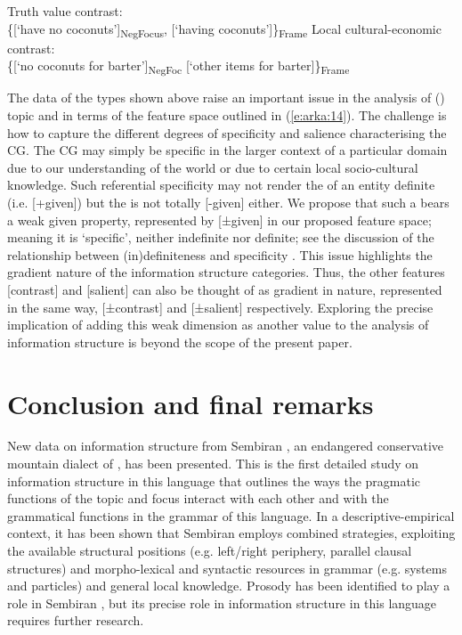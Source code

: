 \documentclass[output=paper
,modfonts
,nonflat]{langsci/langscibook}
\begin{document}
\begin{exe}
	\ex\label{e:arka:61}
	\begin{xlist}
		\ex\label{e:arka:61a}
		Truth value contrast:\\
		\{[‘have no coconuts’]\textsubscript{NegFocus}, [‘having coconuts’]\}\textsubscript{Frame} 
		\ex\label{e:arka:61b}
		Local cultural-economic contrast:\\
		\{[‘no coconuts for barter’]\textsubscript{NegFoc}  [‘other items for barter]\}\textsubscript{Frame}
	\end{xlist}
\end{exe}

\noindent
The data of the types shown above raise an important issue in the analysis of () topic and  in terms of the feature space outlined in (\ref{e:arka:14}). The challenge is how to capture the different degrees of specificity and salience characterising the CG. The CG may simply be specific in the larger context of a particular domain due to our understanding of the world or due to certain local socio-cultural knowledge. Such referential specificity may not render the  of an entity definite (i.e. [+given]) but the  is not totally [-given] either. We propose that such a  bears a weak given property, represented by [±given] in our proposed feature space; meaning it is ‘specific’, neither indefinite nor definite; see the discussion of the relationship between (in)definiteness and specificity \citep{Enç1991}. This issue highlights the gradient nature of the information structure categories. Thus, the other features [contrast] and [salient] can also be thought of as gradient in nature, represented in the same way, [±contrast] and [±salient] respectively. Exploring the precise implication of adding this weak dimension as another value to the analysis of information structure is beyond the scope of the present paper.

\section{\label{s:arka:7}Conclusion and final remarks}

New data on information structure from Sembiran , an endangered conservative mountain dialect of , has been presented. This is the first detailed study on information structure in this language that outlines the ways the pragmatic functions of the topic and focus interact with each other and with the grammatical functions in the grammar of this language. In a descriptive-empirical context, it has been shown that Sembiran  employs combined strategies, exploiting the available structural positions (e.g. left/right periphery, parallel clausal structures) and morpho-lexical and syntactic resources in grammar (e.g.  systems and particles) and general local knowledge. Prosody has been identified to play a role in Sembiran , but its precise role in information structure in this language requires further research.
\end{document}
